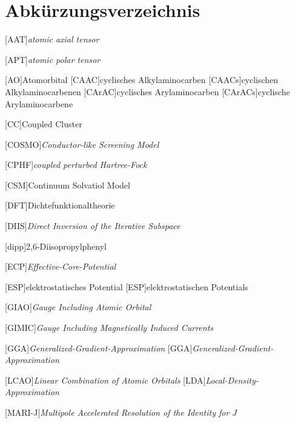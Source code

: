  {}
\renewcommand\refname{Abkürzungsverzeichnis} \chapter*{Abkürzungsverzeichnis}
\begin{acronym}[SEPSEP] %
    \setlength{\itemsep}{0.2cm} %
    
    [AAT]{\textit{atomic axial tensor}}
    
    [APT]{\textit{atomic polar tensor}}
    
    [AO]{Atomorbital}
	[CAAC]{cyclisches Alkylaminocarben}   
		[CAACs]{cyclischen Alkylaminocarbenen}
	[CArAC]{cyclisches Arylaminocarben}
		[CArACs]{cyclische Arylaminocarbene}
		
    [CC]{Coupled Cluster}		
		
 	[COSMO]{\textit{Conductor-like Screening Model}}
 	
	[CPHF]{\textit{coupled perturbed Hartree-Fock}}
	
	[CSM]{Continuum Solvatiol Model}
 	
    [DFT]{Dichtefunktionaltheorie}
    
    [DIIS]{\textit{Direct Inversion of the Iterative Subspace}}
    
    [dipp]{2,6-Diisopropylphenyl}
    
    [ECP]{\textit{Effective-Core-Potential}}
    
    [ESP]{elektrostatisches Potential}
	    [ESP]{elektrostatischen Potentials}
	
	[GIAO]{\textit{Gauge Including Atomic Orbital}}   
	
	[GIMIC]{\textit{Gauge Including Magnetically Induced Currents}} 

	[GGA]{\textit{Generalized-Gradient-Approximation}}   
		[GGA]{\textit{Generalized-Gradient-Approximation}}
		
	[LCAO]{\textit{Linear Combination of Atomic Orbitals}}
	[LDA]{\textit{Local-Density-Approximation}}
     
    [MARI-J]{\textit{Multipole Accelerated Resolution of the Identity for $J$}} 	
 	

\end{acronym}
